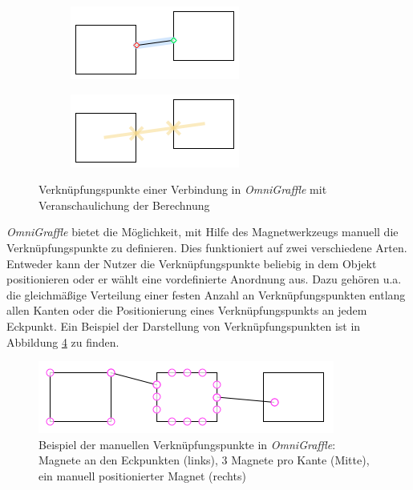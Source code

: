 \begin{figure}[hbt]
    \newcommand{\subfigurewidth}{0.5\textwidth}
    \newcommand{\graphicswidth}{0.8\linewidth}
    \begin{subfigure}{\subfigurewidth}
        \centering
        \includegraphics[width=\graphicswidth]{resources/omnigraffle-connection-points-a}
        \caption{}
        \label{fig:omnigraffle-connection-points-a}
    \end{subfigure}
    \begin{subfigure}{\subfigurewidth}
        \centering
        \includegraphics[width=\graphicswidth]{resources/omnigraffle-connection-points-b}
        \caption{}
        \label{fig:omnigraffle-connection-points-b}
    \end{subfigure}
    \caption{Verknüpfungspunkte einer Verbindung in \textit{OmniGraffle}  mit Veranschaulichung der Berechnung }
    \label{fig:omnigraffle-connection-points}
\end{figure}

\textit{OmniGraffle} bietet die Möglichkeit, mit Hilfe des Magnetwerkzeugs manuell die Verknüpfungspunkte zu definieren. Dies funktioniert auf zwei verschiedene Arten. Entweder kann der Nutzer die Verknüpfungspunkte beliebig in dem Objekt positionieren oder er wählt eine vordefinierte Anordnung aus. Dazu gehören u.a. die gleichmäßige Verteilung einer festen Anzahl an Verknüpfungspunkten entlang allen Kanten oder die Positionierung eines Verknüpfungspunkts an jedem Eckpunkt. Ein Beispiel der Darstellung von Verknüpfungspunkten ist in Abbildung \ref{fig:omnigraffle-magnets-example} zu finden.

\begin{figure}[hbt]
    \centering
    \includegraphics{resources/omnigraffle-magnets-example.png}
    \caption{Beispiel der manuellen Verknüpfungspunkte in \textit{OmniGraffle}: Magnete an den Eckpunkten (links), 3 Magnete pro Kante (Mitte), ein manuell positionierter Magnet (rechts)}
    \label{fig:omnigraffle-magnets-example}
\end{figure}

